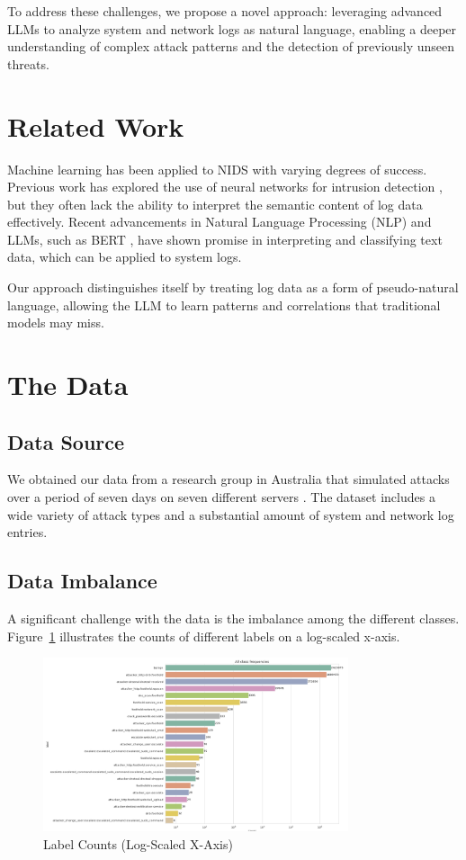 \documentclass[12pt]{article}
\begin{document}
To address these challenges, we propose a novel approach: leveraging advanced LLMs to analyze system and network logs as natural language, enabling a deeper understanding of complex attack patterns and the detection of previously unseen threats.

\section{Related Work}

Machine learning has been applied to NIDS with varying degrees of success. Previous work has explored the use of neural networks for intrusion detection \citep{neuralnids}, but they often lack the ability to interpret the semantic content of log data effectively. Recent advancements in Natural Language Processing (NLP) and LLMs, such as BERT \citep{bert}, have shown promise in interpreting and classifying text data, which can be applied to system logs.

Our approach distinguishes itself by treating log data as a form of pseudo-natural language, allowing the LLM to learn patterns and correlations that traditional models may miss.

\section{The Data}

\subsection{Data Source}

We obtained our data from a research group in Australia that simulated attacks over a period of seven days on seven different servers \citep{landauer2022ait}. The dataset includes a wide variety of attack types and a substantial amount of system and network log entries.

\subsection{Data Imbalance}

A significant challenge with the data is the imbalance among the different classes. Figure~\ref{fig:label_counts} illustrates the counts of different labels on a log-scaled x-axis.

\begin{figure}[htbp]
    \centering
    \includegraphics[width=0.8\textwidth]{label_counts.png}
    \caption{Label Counts (Log-Scaled X-Axis)}
    \label{fig:label_counts}
\end{figure}
\end{document}

